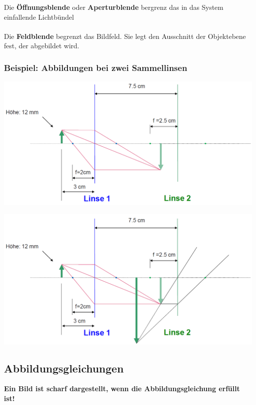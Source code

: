 Die \textbf{Öffnungsblende} oder \textbf{Aperturblende} bergrenz das in das System einfallende Lichtbündel \\
\\
Die \textbf{Feldblende} begrenzt das Bildfeld. Sie legt den Ausschnitt der Objektebene fest, der abgebildet wird.


\subsubsection{Beispiel: Abbildungen bei zwei Sammellinsen}

\begin{minipage}{0.48\linewidth}
\includegraphics[width=0.98\linewidth]{Bilder/Wellen-Optik/zwei_sammellinsen_1} 
\end{minipage}
\hfill
\begin{minipage}{0.48\linewidth}
\includegraphics[width=0.98\linewidth]{Bilder/Wellen-Optik/zwei_sammellinsen_2} 
\end{minipage}





\subsection{Abbildungsgleichungen}
\textbf{Ein Bild ist scharf dargestellt, wenn die Abbildungsgleichung erfüllt ist!} \\



